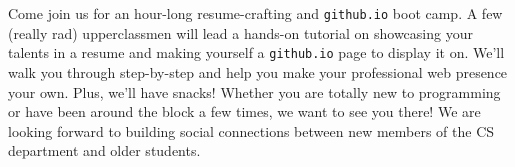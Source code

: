 Come join us for an hour-long resume-crafting and \texttt{github.io} boot camp. A few (really rad) upperclassmen will lead a hands-on tutorial on showcasing your talents in a resume and making yourself a \texttt{github.io} page to display it on. We'll walk you through step-by-step and help you make your professional web presence your own. Plus, we'll have snacks! Whether you are totally new to programming or have been around the block a few times, we want to see you there! We are looking forward to building social connections between new members of the CS department and older students.